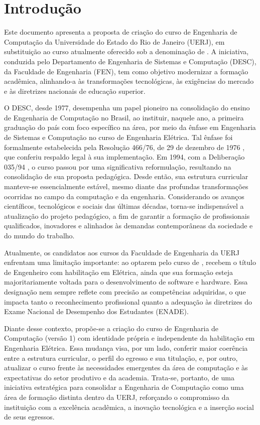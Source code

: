 \chapter{Introdução}
\thispagestyle{plain}
\label{intro} %

Este documento apresenta a proposta de criação do curso de Engenharia de Computação da Universidade do Estado do Rio de Janeiro (UERJ), em substituição ao curso atualmente oferecido sob a denominação de \cursoatual. A iniciativa, conduzida pelo Departamento de Engenharia de Sistemas e Computação (DESC), da Faculdade de Engenharia (FEN), tem como objetivo modernizar a formação acadêmica, alinhando-a às transformações tecnológicas, às exigências do mercado e às diretrizes nacionais de educação superior.

O DESC, desde 1977, desempenha um papel pioneiro na consolidação do ensino de Engenharia de Computação no Brasil, ao instituir, naquele ano, a primeira graduação do país com foco específico na área, por meio da ênfase em Engenharia de Sistemas e Computação no curso de Engenharia Elétrica. Tal ênfase foi formalmente estabelecida pela Resolução  466/76, de 29 de dezembro de 1976 \cite{uerj1976}, que conferiu respaldo legal à sua implementação. Em 1994, com a Deliberação  035/94 \cite{uerj1994}, o curso passou por uma significativa reformulação, resultando na consolidação de sua proposta pedagógica. Desde então, sua estrutura curricular manteve-se essencialmente estável, mesmo diante das profundas transformações ocorridas no campo da computação e da engenharia. Considerando os avanços científicos, tecnológicos e sociais das últimas décadas, torna-se indispensável a atualização do projeto pedagógico, a fim de garantir a formação de profissionais qualificados, inovadores e alinhados às demandas contemporâneas da sociedade e do mundo do trabalho.

Atualmente, os candidatos aos cursos da Faculdade de Engenharia da UERJ enfrentam uma limitação importante: ao optarem pelo curso de \cursoatual, recebem o título de Engenheiro com habilitação em Elétrica, ainda que sua formação esteja majoritariamente voltada para o desenvolvimento de software e hardware. Essa designação nem sempre reflete com precisão as competências adquiridas, o que impacta tanto o reconhecimento profissional quanto a adequação às diretrizes do Exame Nacional de Desempenho dos Estudantes (ENADE).

Diante desse contexto, propõe-se a criação do curso de Engenharia de Computação (versão 1) com identidade própria e independente da habilitação em Engenharia Elétrica. Essa mudança visa, por um lado, conferir maior coerência entre a estrutura curricular, o perfil do egresso e sua titulação, e, por outro, atualizar o curso frente às necessidades emergentes da área de computação e às expectativas do setor produtivo e da academia. Trata-se, portanto, de uma iniciativa estratégica para consolidar a Engenharia de Computação como uma área de formação distinta dentro da UERJ, reforçando o compromisso da instituição com a excelência acadêmica, a inovação tecnológica e a inserção social de seus egressos.

